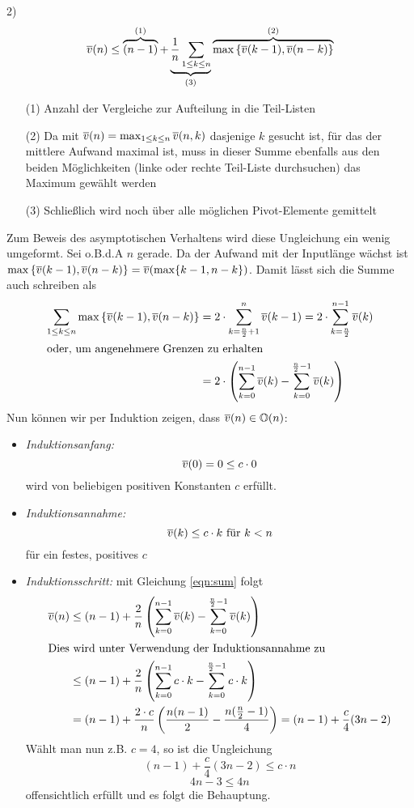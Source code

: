 \begin{paragraph}{2)}
\[ \overline{v}(n) \leq \overbrace{(n-1)}^{(1)} +
\underbrace{\frac{1}{n}\sum_{1\leq k \leq n}}_{(3)}
\overbrace{\max\left\{\overline{v}(k-1),\overline{v}(n-k)\right\}}^{(2)} \]
\begin{itemize}
	\item[(1)] Anzahl der Vergleiche zur Aufteilung in die Teil-Listen
	\item[(2)] Da mit $\overline{v}(n) =
		\max_{1\leq k\leq n}\overline{v}(n,k)$ dasjenige $k$ gesucht ist, für das
		der mittlere Aufwand maximal ist, muss in dieser Summe
		ebenfalls aus den beiden Möglichkeiten (linke oder rechte
		Teil-Liste durchsuchen) das Maximum gewählt werden
	\item[(3)] Schließlich wird noch über alle möglichen Pivot-Elemente gemittelt
\end{itemize}
Zum Beweis des asymptotischen Verhaltens wird diese Ungleichung ein wenig
umgeformt. Sei o.B.d.A $n$ gerade. Da der Aufwand mit der Inputlänge wächst ist
$\max\left\{\overline{v}(k-1), \overline{v}(n-k)\right\} =
\overline{v}(\max\{k-1,n-k\})$. Damit lässt sich die Summe auch schreiben als
\begin{align} \nonumber \sum_{1\leq k\leq n} \max\left\{\overline{v}(k-1),\overline{v}(n-k)\right\}
&= 2 \cdot \sum_{k=\frac{n}{2}+1}^n \overline{v}(k-1) = 2 \cdot \sum_{k=\frac{n}{2}}^{n-1} \overline{v}(k) \\
\intertext{oder, um angenehmere Grenzen zu erhalten}
&= 2 \cdot \left(\sum_{k=0}^{n-1} \overline{v}(k) - \sum_{k=0}^{\frac{n}{2}-1} \overline{v}(k)\right) \label{eqn:sum}
\end{align}
Nun können wir per Induktion zeigen, dass $\overline{v}(n) \in \mathbb{O}(n)$:
\begin{itemize}
	\item \textit{Induktionsanfang:} \[ \overline{v}(0) = 0 \leq c \cdot 0 \]
		wird von beliebigen positiven Konstanten $c$ erfüllt.
	\item \textit{Induktionsannahme:} \[ \overline{v}(k) \leq c \cdot k \text{ für } k < n \]
		für ein festes, positives $c$
	\item \textit{Induktionsschritt:} mit Gleichung \eqref{eqn:sum} folgt
		\begin{align*}
			\overline{v}(n) &\leq (n-1) + \frac{2}{n}
			\left(\sum_{k=0}^{n-1} \overline{v}(k) -
			\sum_{k=0}^{\frac{n}{2}-1} \overline{v}(k)\right) \\
			\intertext{Dies wird unter Verwendung der Induktionsannahme zu}
			&\leq (n-1) + \frac{2}{n} \left(\sum_{k=0}^{n-1}
			c \cdot k - \sum_{k=0}^{\frac{n}{2}-1} c \cdot k\right) \\
			&= (n-1) + \frac{2\cdot c}{n} \left(\frac{n(n-1)}{2}-\frac{n(\frac{n}{2}-1)}{4}\right) = (n-1) + \frac{c}{4} (3n - 2)
		\end{align*}
		Wählt man nun z.B. $c = 4$, so ist die Ungleichung
			\[ (n-1) + \frac{c}{4} (3n - 2) \leq c \cdot n \]
			\[ 4n-3 \leq 4n \]
		offensichtlich erfüllt und es folgt die Behauptung.
\end{itemize}
\end{paragraph}
